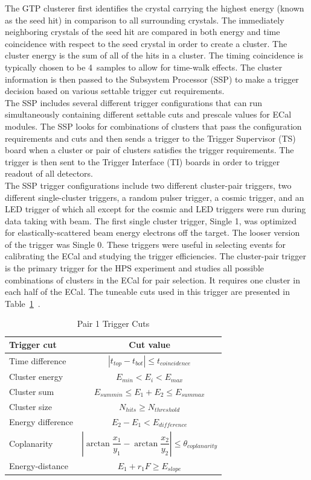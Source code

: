 \indent The GTP clusterer first identifies the crystal carrying the highest energy (known as the seed hit) in comparison to all surrounding crystals. The immediately neighboring crystals of the seed hit are compared in both energy and time coincidence with respect to the seed crystal in order to create a cluster. The cluster energy is the sum of all of the hits in a cluster. The timing coincidence is typically chosen to be 4~samples to allow for time-walk effects. The cluster information is then passed to the Subsystem Processor (SSP) to make a trigger decision based on various settable trigger cut requirements. \\
\indent The SSP includes several different trigger configurations that can run simultaneously containing different settable cuts and prescale values for ECal modules. The SSP looks for combinations of clusters that pass the configuration requirements and cuts and then sends a trigger to the Trigger Supervisor (TS) board when a cluster or pair of clusters satisfies the trigger requirements. The trigger is then sent to the Trigger Interface (TI) boards in order to trigger readout of all detectors.\\ 
\indent The SSP trigger configurations include two different cluster-pair triggers, two different single-cluster triggers, a random pulser trigger, a cosmic trigger, and an LED trigger of which all except for the cosmic and LED triggers were run during data taking with beam. The first single cluster trigger, Single 1, was optimized for elastically-scattered beam energy electrons off the target. The looser version of the trigger was Single 0. These triggers were useful in selecting events for calibrating the ECal and studying the trigger efficiencies. The cluster-pair trigger is the primary trigger for the HPS experiment and studies all possible combinations of clusters in the ECal for pair selection. It requires one cluster in each half of the ECal. The tuneable cuts used in this trigger are presented in Table~\ref{tab:pairTriggerCuts}~\cite{balossino_hps_2016}. \\
\begin{table}[htb]
\caption{Pair 1 Trigger Cuts}
\label{tab:pairTriggerCuts}
\centering
\begin{tabular}{lc}
\toprule
Trigger cut & Cut value \\
\midrule
Time difference & $| t_{top}-t_{bot} | \leq t_{coincidence}$   \\
Cluster energy & $E_{min}<E_{i}<E_{max}$\\
Cluster sum & $E_{sum min}\leq E_1+E_2\leq E_{sum max}$\\
Cluster size & $N_{hits}\geq N_{threshold}$\\
Energy difference & $ E_{2}-E_{1}<E_{difference}$\\
Coplanarity & $ |\arctan\dfrac{x_1}{y_1}-\arctan\dfrac{x_2}{y_2} | \leq \theta_{coplanarity}$\\
Energy-distance & $E_{1}+r_{1}F\geq E_{slope}$ \\ 
\bottomrule
\end{tabular}
\end{table}
